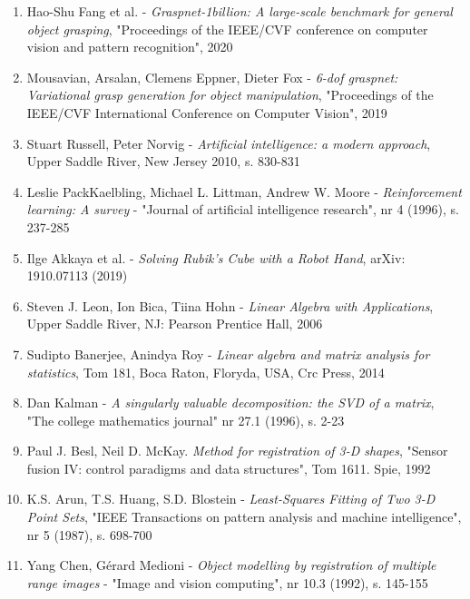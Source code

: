 \documentclass{article}
\begin{document}
\begin{enumerate}
\newpage
\item Hao-Shu Fang et al. - \emph{Graspnet-1billion: A large-scale benchmark for general object grasping}, "Proceedings of the IEEE/CVF conference on computer vision and pattern recognition", 2020

\item Mousavian, Arsalan, Clemens Eppner, Dieter Fox - \emph{6-dof graspnet: Variational grasp generation for object manipulation}, "Proceedings of the IEEE/CVF International Conference on Computer Vision", 2019

\item Stuart Russell, Peter Norvig - \emph{Artificial intelligence: a modern approach}, Upper Saddle River, New Jersey 2010, s. 830-831

\item Leslie PackKaelbling, Michael L. Littman, Andrew W. Moore - \emph{Reinforcement learning: A survey} - "Journal of artificial intelligence research", nr 4 (1996), s. 237-285

\item Ilge Akkaya et al. - \emph{Solving Rubik's Cube with a Robot Hand}, arXiv: 1910.07113 (2019)

\item Steven J. Leon, Ion Bica, Tiina Hohn - \emph{Linear Algebra with Applications}, Upper Saddle River, NJ: Pearson Prentice Hall, 2006

\item Sudipto Banerjee, Anindya Roy - \emph{Linear algebra and matrix analysis for statistics}, Tom 181, Boca Raton, Floryda, USA, Crc Press, 2014

\item Dan Kalman - \emph{A singularly valuable decomposition: the SVD of a matrix}, "The college mathematics journal" nr 27.1 (1996), s. 2-23

\item Paul J. Besl, Neil D. McKay. \emph{Method for registration of 3-D shapes}, "Sensor fusion IV: control paradigms and data structures", Tom 1611. Spie, 1992

\item K.S. Arun, T.S. Huang, S.D. Blostein - \emph{Least-Squares Fitting of Two 3-D Point Sets}, "IEEE Transactions on pattern analysis and machine intelligence", nr 5 (1987), s. 698-700

\item Yang Chen, Gérard Medioni - \emph{Object modelling by registration of multiple range images} - "Image and vision computing", nr 10.3 (1992), s. 145-155


\end{enumerate}
\end{document}
